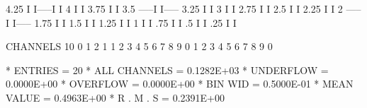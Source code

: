 \begin{Listing}
        4.25                   I                            I-----I                                      I
        4                      I                                                                         I
        3.75                   I                                                                         I
        3.5               -----I                                                                         I-----
        3.25              I                                                                                   I
        3                 I                                                                                   I
        2.75              I                                                                                   I
        2.5               I                                                                                   I
        2.25              I                                                                                   I
        2            -----I                                                                                   I-----
        1.75         I                                                                                             I
        1.5          I                                                                                             I
        1.25         I                                                                                             I
        1            I                                                                                             I
         .75         I                                                                                             I
         .5          I                                                                                             I
         .25         I                                                                                             I
 
 CHANNELS  10       0                                            1                                                 2   
            1       1    2    3    4    5    6    7    8    9    0    1    2    3    4    5    6    7    8    9    0   
 
 * ENTRIES =         20      * ALL CHANNELS = 0.1282E+03      * UNDERFLOW = 0.0000E+00      * OVERFLOW = 0.0000E+00
 * BIN WID = 0.5000E-01      * MEAN VALUE   = 0.4963E+00      * R . M . S = 0.2391E+00
\end{Listing}
